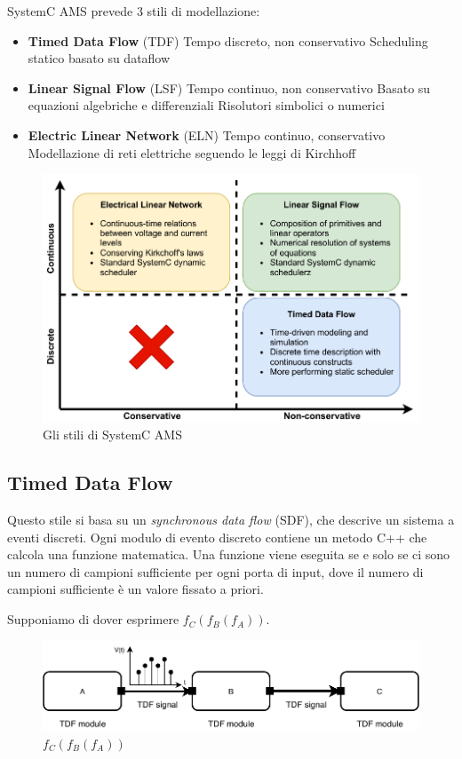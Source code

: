 \documentclass[10pt,a4paper,oneside]{scrbook}
\begin{document}
SystemC AMS prevede 3 stili di modellazione:
\begin{itemize}
    \item \textbf{Timed Data Flow} (TDF)
    \subitem Tempo discreto, non conservativo
    \subitem Scheduling statico basato su dataflow
    \item \textbf{Linear Signal Flow} (LSF)
    \subitem Tempo continuo, non conservativo
    \subitem Basato su equazioni algebriche e differenziali
    \subitem Risolutori simbolici o numerici
    \item \textbf{Electric Linear Network} (ELN)
    \subitem Tempo continuo, conservativo
    \subitem Modellazione di reti elettriche seguendo le leggi di Kirchhoff
\end{itemize}

\begin{figure}[h]
\centering
\includegraphics[width=1\linewidth]{"img/ams styles"}
\caption{Gli stili di SystemC AMS}
\label{fig:ams-styles}
\end{figure}

\subsection{Timed Data Flow}
Questo stile si basa su un \textit{synchronous data flow} (SDF), che descrive un sistema a eventi discreti.
Ogni modulo di evento discreto contiene un metodo C++ che calcola una funzione matematica.
Una funzione viene eseguita se e solo se ci sono un numero di campioni sufficiente per ogni porta di input, dove il
numero di campioni sufficiente è un valore fissato a priori.

Supponiamo di dover esprimere $f_C(f_B(f_A))$.
\begin{figure}[h]
\centering
\includegraphics[width=1\linewidth]{"img/tdf"}
\caption{$f_C(f_B(f_A))$}
\label{fig:tdf}
\end{figure}
\end{document}
